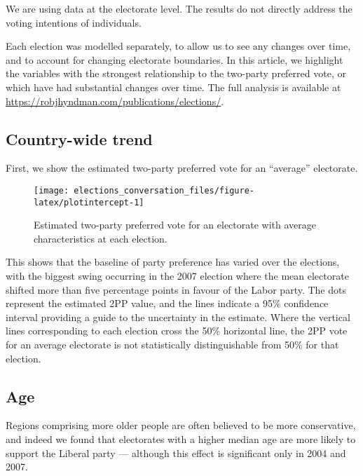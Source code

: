 \documentclass[11pt,a4paper,]{article}
\begin{document}
We are using data at the electorate level. The results do not directly address the voting intentions of individuals.

Each election was modelled separately, to allow us to see any changes over time, and to account for changing electorate boundaries. In this article, we highlight the variables with the strongest relationship to the two-party preferred vote, or which have had substantial changes over time. The full analysis is available at \url{https://robjhyndman.com/publications/elections/}.

\hypertarget{country-wide-trend}{%
\subsection*{Country-wide trend}\label{country-wide-trend}}

First, we show the estimated two-party preferred vote for an ``average'' electorate.

\begin{figure}[H]

{\centering \texttt{[image: elections\_conversation\_files/figure-latex/plotintercept-1]} 

}

\caption{Estimated two-party preferred vote for an electorate with average characteristics at each election.}\label{fig:plotintercept}
\end{figure}

This shows that the baseline of party preference has varied over the elections, with the biggest swing occurring in the 2007 election where the mean electorate shifted more than five percentage points in favour of the Labor party. The dots represent the estimated 2PP value, and the lines indicate a 95\% confidence interval providing a guide to the uncertainty in the estimate. Where the vertical lines corresponding to each election cross the 50\% horizontal line, the 2PP vote for an average electorate is not statistically distinguishable from 50\% for that election.

\hypertarget{age}{%
\subsection*{Age}\label{age}}

Regions comprising more older people are often believed to be more conservative, and indeed we found that electorates with a higher median age are more likely to support the Liberal party --- although this effect is significant only in 2004 and 2007.
\end{document}
